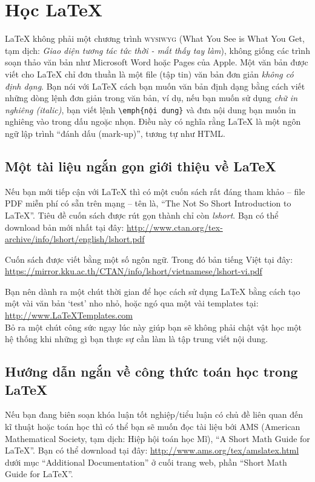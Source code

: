 \section{Học \LaTeX{}}

\LaTeX{} không phải một chương trình \textsc{wysiwyg} (What You See is What You Get, tạm dịch: \textit{Giao diện tương tác tức thời - mắt thấy tay làm}), không giống các trình soạn thảo văn bản như Microsoft Word hoặc Pages của Apple. Một văn bản được viết cho \LaTeX{} chỉ đơn thuần là một file (tập tin) văn bản đơn giản \emph{không có định dạng}. Bạn nói với \LaTeX{} cách bạn muốn văn bản định dạng bằng cách viết những dòng lệnh đơn giản trong văn bản, ví dụ, nếu bạn muốn sử dụng \emph{chữ in nghiêng (italic)}, bạn viết lệnh \verb|\emph{nội dung}| và đưa nội dung bạn muốn in nghiêng vào trong dấu ngoặc nhọn. Điều này có nghĩa rằng \LaTeX{} là một ngôn ngữ lập trình \enquote{đánh dấu (mark-up)}, tương tự như HTML.


\subsection{Một tài liệu ngắn gọn giới thiệu về \LaTeX{}}

Nếu bạn mới tiếp cận với \LaTeX{} thì có một cuốn sách rất đáng tham khảo -- file PDF miễn phí có sẵn trên mạng -- tên là, \enquote{The Not So Short Introduction to \LaTeX{}}. Tiêu đề cuốn sách được rút gọn thành chỉ còn \emph{lshort}. Bạn có thể download bản mới nhất tại đây:
\url{http://www.ctan.org/tex-archive/info/lshort/english/lshort.pdf}

Cuốn sách được viết bằng một số ngôn ngữ. Trong đó bản tiếng Việt tại đây:
\url{https://mirror.kku.ac.th/CTAN/info/lshort/vietnamese/lshort-vi.pdf}

Bạn nên dành ra một chút thời gian để học cách sử dụng \LaTeX{} bằng cách tạo một vài văn bản `test' nho nhỏ, hoặc ngó qua một vài templates tại:\\
\url{http://www.LaTeXTemplates.com}\\
Bỏ ra một chút công sức ngay lúc này giúp bạn sẽ không phải chật vật học một hệ thống khi những gì bạn thực sự cần làm là tập trung viết nội dung.


\subsection{Hướng dẫn ngắn về công thức toán học trong \LaTeX{}}

Nếu bạn đang biên soạn khóa luận tốt nghiệp/tiểu luận có chủ đề liên quan đến kĩ thuật hoặc toán học thì có thể bạn sẽ muốn đọc tài liệu bới AMS (American Mathematical Society, tạm dịch: Hiệp hội toán học Mĩ), \enquote{A Short Math Guide for \LaTeX{}}. Bạn có thể download tại đây:
\url{http://www.ams.org/tex/amslatex.html}
dưới mục \enquote{Additional Documentation} ở cuối trang web, phần \enquote{Short Math Guide for \LaTeX{}}.


